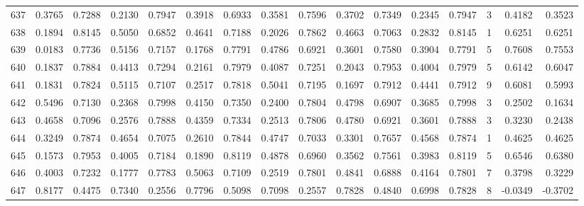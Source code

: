 \begin{tabular}{lrrrrrrrrrrrrrrr}
637 &      0.3765 &  0.7288 &  0.2130 &  0.7947 &  0.3918 &  0.6933 &  0.3581 &  0.7596 &  0.3702 &  0.7349 &   0.2345 &     0.7947 &      3 &                    0.4182 &                     0.3523 \\
638 &      0.1894 &  0.8145 &  0.5050 &  0.6852 &  0.4641 &  0.7188 &  0.2026 &  0.7862 &  0.4663 &  0.7063 &   0.2832 &     0.8145 &      1 &                    0.6251 &                     0.6251 \\
639 &      0.0183 &  0.7736 &  0.5156 &  0.7157 &  0.1768 &  0.7791 &  0.4786 &  0.6921 &  0.3601 &  0.7580 &   0.3904 &     0.7791 &      5 &                    0.7608 &                     0.7553 \\
640 &      0.1837 &  0.7884 &  0.4413 &  0.7294 &  0.2161 &  0.7979 &  0.4087 &  0.7251 &  0.2043 &  0.7953 &   0.4004 &     0.7979 &      5 &                    0.6142 &                     0.6047 \\
641 &      0.1831 &  0.7824 &  0.5115 &  0.7107 &  0.2517 &  0.7818 &  0.5041 &  0.7195 &  0.1697 &  0.7912 &   0.4441 &     0.7912 &      9 &                    0.6081 &                     0.5993 \\
642 &      0.5496 &  0.7130 &  0.2368 &  0.7998 &  0.4150 &  0.7350 &  0.2400 &  0.7804 &  0.4798 &  0.6907 &   0.3685 &     0.7998 &      3 &                    0.2502 &                     0.1634 \\
643 &      0.4658 &  0.7096 &  0.2576 &  0.7888 &  0.4359 &  0.7334 &  0.2513 &  0.7806 &  0.4780 &  0.6921 &   0.3601 &     0.7888 &      3 &                    0.3230 &                     0.2438 \\
644 &      0.3249 &  0.7874 &  0.4654 &  0.7075 &  0.2610 &  0.7844 &  0.4747 &  0.7033 &  0.3301 &  0.7657 &   0.4568 &     0.7874 &      1 &                    0.4625 &                     0.4625 \\
645 &      0.1573 &  0.7953 &  0.4005 &  0.7184 &  0.1890 &  0.8119 &  0.4878 &  0.6960 &  0.3562 &  0.7561 &   0.3983 &     0.8119 &      5 &                    0.6546 &                     0.6380 \\
646 &      0.4003 &  0.7232 &  0.1777 &  0.7783 &  0.5063 &  0.7109 &  0.2519 &  0.7801 &  0.4841 &  0.6888 &   0.4164 &     0.7801 &      7 &                    0.3798 &                     0.3229 \\
647 &      0.8177 &  0.4475 &  0.7340 &  0.2556 &  0.7796 &  0.5098 &  0.7098 &  0.2557 &  0.7828 &  0.4840 &   0.6998 &     0.7828 &      8 &                   -0.0349 &                    -0.3702 \\

\end{tabular}

